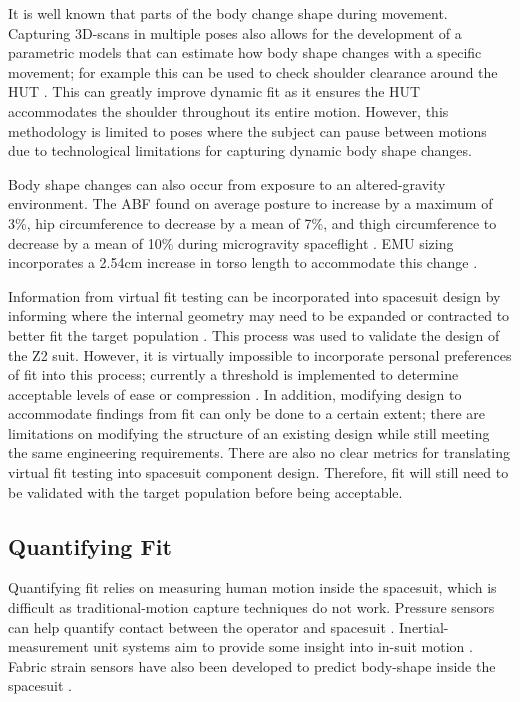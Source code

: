 \documentclass[defaultstyle,11pt]{comps}
\begin{document}
It is well known that parts of the body change shape during movement.
Capturing 3D-scans in multiple poses also allows for the development of a parametric models that can estimate how body shape changes with a specific movement; for example this can be used to check shoulder clearance around the HUT \citep{Kim2016}.
This can greatly improve dynamic fit as it ensures the HUT accommodates the shoulder throughout its entire motion.
However, this methodology is limited to poses where the subject can pause between motions due to technological limitations for capturing dynamic body shape changes.

Body shape changes can also occur from exposure to an altered-gravity environment.
The ABF found on average posture to increase by a maximum of 3\%, hip circumference to decrease by a mean of 7\%, and thigh circumference to decrease by a mean of 10\% during microgravity spaceflight \citep{Kim2019}.
EMU sizing incorporates a 2.54cm increase in torso length to accommodate this change \citep{Thornton1987}.

Information from virtual fit testing can be incorporated into spacesuit design by informing where the internal geometry may need to be expanded or contracted to better fit the target population \citep{Kim2019}.
This process was used to validate the design of the Z2 suit.
However, it is virtually impossible to incorporate personal preferences of fit into this process; currently a threshold is implemented to determine acceptable levels of ease or compression \citep{Kim2019}.
In addition, modifying design to accommodate findings from fit can only be done to a certain extent; there are limitations on modifying the structure of an existing design while still meeting the same engineering requirements.
There are also no clear metrics for translating virtual fit testing into spacesuit component design.
Therefore, fit will still need to be validated with the target population before being acceptable.

\hypertarget{quantifying-fit}{%
\subsection{Quantifying Fit}\label{quantifying-fit}}

Quantifying fit relies on measuring human motion inside the spacesuit, which is difficult as traditional-motion capture techniques do not work.
Pressure sensors can help quantify contact between the operator and spacesuit \citep{Anderson2014}.
Inertial-measurement unit systems aim to provide some insight into in-suit motion \citep[\citet{Shen2019}]{Bertrand2016}.
Fabric strain sensors have also been developed to predict body-shape inside the spacesuit \citep{Kim2019}.
\end{document}

